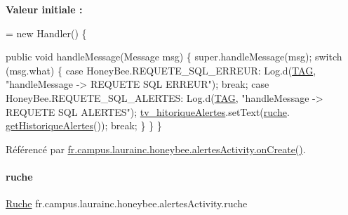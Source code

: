 {\bfseries Valeur initiale \+:}
\begin{DoxyCode}
= \textcolor{keyword}{new} Handler()
    \{
        
        \textcolor{keyword}{public} \textcolor{keywordtype}{void} handleMessage(Message msg)
        \{
            super.handleMessage(msg);
            \textcolor{keywordflow}{switch} (msg.what)
            \{
                \textcolor{keywordflow}{case} HoneyBee.REQUETE\_SQL\_ERREUR:
                    Log.d(\hyperlink{classfr_1_1campus_1_1laurainc_1_1honeybee_1_1alertes_activity_af9b493032767c7ef4a5fa29d194e3bb3}{TAG}, \textcolor{stringliteral}{"handleMessage -> REQUETE SQL ERREUR"});
                    \textcolor{keywordflow}{break};
                \textcolor{keywordflow}{case} HoneyBee.REQUETE\_SQL\_ALERTES:
                    Log.d(\hyperlink{classfr_1_1campus_1_1laurainc_1_1honeybee_1_1alertes_activity_af9b493032767c7ef4a5fa29d194e3bb3}{TAG}, \textcolor{stringliteral}{"handleMessage -> REQUETE SQL ALERTES"});
                    \hyperlink{classfr_1_1campus_1_1laurainc_1_1honeybee_1_1alertes_activity_a957b9ea11ac3b17e5058cb91f93500e3}{tv\_hitoriqueAlertes}.setText(\hyperlink{classfr_1_1campus_1_1laurainc_1_1honeybee_1_1alertes_activity_a60ca5664100d5d388966a90342e7c93f}{ruche}.
      \hyperlink{classfr_1_1campus_1_1laurainc_1_1honeybee_1_1_ruche_a97cc64f6d39ee995175e389bad662b86}{getHistoriqueAlertes}());
                    \textcolor{keywordflow}{break};
            \}
        \}
    \}
\end{DoxyCode}


Référencé par \hyperlink{classfr_1_1campus_1_1laurainc_1_1honeybee_1_1alertes_activity_ade0f23cba3f8f4aaa65367baea096d88}{fr.\+campus.\+laurainc.\+honeybee.\+alertes\+Activity.\+on\+Create()}.

\mbox{\label{classfr_1_1campus_1_1laurainc_1_1honeybee_1_1alertes_activity_a60ca5664100d5d388966a90342e7c93f}} 
\paragraph{\texorpdfstring{ruche}{ruche}}
{\footnotesize\ttfamily \hyperlink{classfr_1_1campus_1_1laurainc_1_1honeybee_1_1_ruche}{Ruche} fr.\+campus.\+laurainc.\+honeybee.\+alertes\+Activity.\+ruche\hspace{0.3cm}{\ttfamily [private]}}

